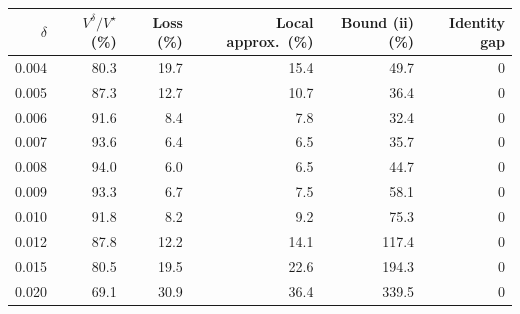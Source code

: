 \begin{tabular}{rrrrrr}
\toprule
$\delta$ & $V^\delta/V^\star$ (\%) & Loss (\%) & Local approx.\ (\%) & Bound (ii) (\%) & Identity gap \\
\midrule
0.004 & 80.3 & 19.7 & 15.4 & 49.7 & $0$ \\
0.005 & 87.3 & 12.7 & 10.7 & 36.4 & $0$ \\
0.006 & 91.6 & 8.4 & 7.8 & 32.4 & $0$ \\
0.007 & 93.6 & 6.4 & 6.5 & 35.7 & $0$ \\
0.008 & 94.0 & 6.0 & 6.5 & 44.7 & $0$ \\
0.009 & 93.3 & 6.7 & 7.5 & 58.1 & $0$ \\
0.010 & 91.8 & 8.2 & 9.2 & 75.3 & $0$ \\
0.012 & 87.8 & 12.2 & 14.1 & 117.4 & $0$ \\
0.015 & 80.5 & 19.5 & 22.6 & 194.3 & $0$ \\
0.020 & 69.1 & 30.9 & 36.4 & 339.5 & $0$ \\
\bottomrule
\end{tabular}
